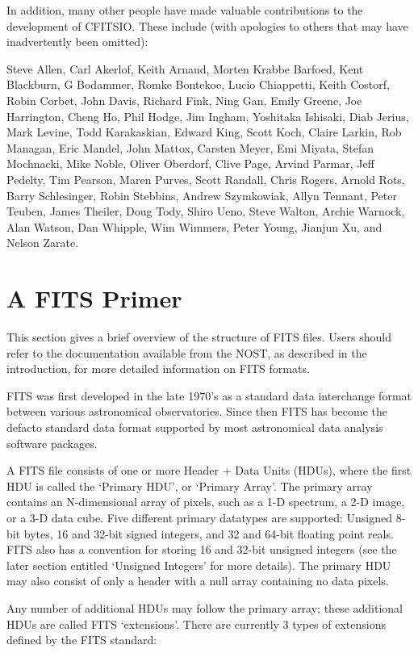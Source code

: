\documentclass[11pt]{book}
\begin{document}
In addition, many other people have made valuable contributions to the
development of CFITSIO.  These include (with apologies to others that may
have inadvertently been omitted):

Steve Allen, Carl Akerlof, Keith Arnaud, Morten Krabbe Barfoed, Kent
Blackburn, G Bodammer, Romke Bontekoe, Lucio Chiappetti, Keith Costorf,
Robin Corbet, John Davis,  Richard Fink, Ning Gan, Emily Greene, Joe
Harrington, Cheng Ho, Phil Hodge, Jim Ingham, Yoshitaka Ishisaki, Diab
Jerius, Mark Levine, Todd Karakaskian, Edward King, Scott Koch,  Claire
Larkin, Rob Managan, Eric Mandel, John Mattox, Carsten Meyer, Emi
Miyata, Stefan Mochnacki, Mike Noble, Oliver Oberdorf, Clive Page,
Arvind Parmar, Jeff Pedelty, Tim Pearson, Maren Purves, Scott Randall,
Chris Rogers, Arnold Rots, Barry Schlesinger, Robin Stebbins, Andrew
Szymkowiak, Allyn Tennant, Peter Teuben, James Theiler, Doug Tody,
Shiro Ueno, Steve Walton, Archie Warnock, Alan Watson, Dan Whipple, Wim
Wimmers, Peter Young, Jianjun Xu, and Nelson Zarate.


\chapter{  A FITS Primer }

This section gives a brief overview of the structure of FITS files.
Users should refer to the documentation available from the NOST, as
described in the introduction, for more detailed information on FITS
formats.

FITS was first developed in the late 1970's as a standard data
interchange format between various astronomical observatories.  Since
then FITS has become the defacto standard data format supported by most
astronomical data analysis software packages.

A FITS file consists of one or more Header + Data Units (HDUs), where
the first HDU is called the `Primary HDU', or `Primary Array'.  The
primary array contains an N-dimensional array of pixels, such as a 1-D
spectrum, a 2-D image, or a 3-D data cube.  Five different primary
datatypes are supported: Unsigned 8-bit bytes, 16 and 32-bit signed
integers, and 32 and 64-bit floating point reals.  FITS also has a
convention for storing 16 and 32-bit unsigned integers (see the later
section entitled `Unsigned Integers' for more details). The primary HDU
may also consist of only a header with a null array containing no
data pixels.

Any number of additional HDUs may follow the primary array; these
additional HDUs are called FITS `extensions'.  There are currently 3
types of extensions defined by the FITS standard:
\end{document}
